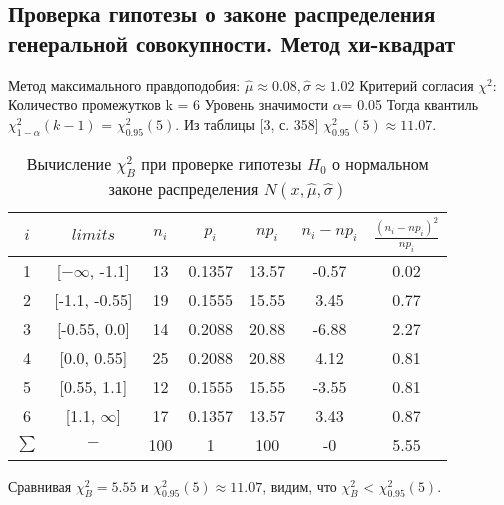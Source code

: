 \subsection{Проверка гипотезы о законе распределения генеральной совокупности. Метод хи-квадрат}
Метод максимального правдоподобия:
\newline
$\hat{\mu} \approx 0.08, \hat{\sigma} \approx 1.02$
\newline
Критерий согласия $\chi^{2}$:
\newline
Количество промежутков k = 6
\newline
Уровень значимости $\alpha$= 0.05
\newline
Тогда квантиль $\chi^{2}_{1-\alpha}(k-1)$ = $\chi^{2}_{0.95}(5)$. Из таблицы [3, с. 358] $\chi^{2}_{0.95}(5) \approx 11.07$. 
\begin{table}[H]
	\centering
	\begin{tabular}{| c | c | c | c | c | c | c |}
		\hline
		$i$ & $limits$         &   $n_i$ &    $p_i$ &   $np_i$ &   $n_i - np_i$ &   $\frac{(n_i-np_i)^2}{np_i}$ \\
		\hline
		1 & [$-\infty$, -1.1] &    13 & 0.1357 &  13.57 &        -0.57 &                        0.02 \\
		2 & [-1.1, -0.55]  &    19 & 0.1555 &  15.55 &         3.45 &                        0.77 \\
		3 & [-0.55, 0.0]   &    14 & 0.2088 &  20.88 &        -6.88 &                        2.27 \\
		4 & [0.0, 0.55]    &    25 & 0.2088 &  20.88 &         4.12 &                        0.81 \\
		5 & [0.55, 1.1]    &    12 & 0.1555 &  15.55 &        -3.55 &                        0.81 \\
		6 & [1.1,  $\infty$]   &    17 & 0.1357 &  13.57 &         3.43 &                        0.87 \\
		$\sum$ & $-$              &   100 & 1      & 100    &        -0    &                        5.55 \\
		\hline
	\end{tabular}
	\caption{ Вычисление $\chi^{2}_{B}$ при проверке гипотезы $H_{0}$ о нормальном законе распределения $N(x,\hat{\mu}, \hat{\sigma})$}
	\label{tab:chi_2}
\end{table}
Сравнивая $\chi^{2}_{B} = 5.55$ и $\chi^{2}_{0.95}(5) \approx 11.07$, видим, что $\chi^{2}_{B}$ < $\chi^{2}_{0.95}(5)$.


	
